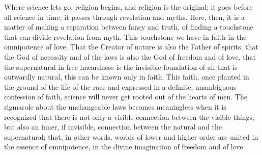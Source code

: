\documentclass[12pt,a4paper,openany]{book}
\newcommand{\opage}[1]{\marginnote{\footnotesize\textit{[#1]}}}
\begin{document}
Where science lets go, religion begins, and religion is the original; it goes before all science in time; it passes through revelation and myths. Here, then, it is a matter of making a separation between fancy and truth, of finding a touchstone that can divide revelation from myth. This touchstone we have in faith in the omnipotence of love. That the Creator of nature is also the Father of spirits, that the God of necessity and of the laws is also the God of freedom and of love, that the supernatural in free inwardness is the invisible foundation of all that is outwardly natural, this can be known only in faith. This faith, once planted in the ground of the life of the race and expressed in a definite, unambiguous confession of faith, science will never get rooted out of the hearts of men. The rigmarole about
\setcounter{footnote}{0}%
\opage{41}the unchangeable laws becomes meaningless when it is recognized that there is not only a visible connection between the visible things, but also an inner, if invisible, connection between the natural and the supernatural; that, in other words, worlds of lower and higher order are united in the essence of omnipotence, in the divine imagination of freedom and of love.
\end{document}
